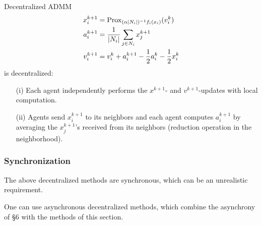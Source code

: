 \documentclass[10pt,mathserif]{beamer}
\begin{document}
\begin{frame}
Decentralized ADMM
\begin{align*}
     x_i^{k+1} &= \prox_{(\alpha|N_i|)^{-1}f_i(x_i)}(v_i^k) \\%
      a_i^{k+1} &= \frac{1}{|N_i|}\sum_{j\in N_i}x_j^{k+1} \\
     v_i^{k+1} &= v_i^k + a_i^{k+1}-\frac{1}{2}a_i^k - \frac{1}{2}x_i^k%
\end{align*}
is decentralized:
\begin{itemize}
\item[(i)] Each agent independently performs the $x^{k+1}$- and $v^{k+1}$-updates with local computation. 
\item[(ii)] Agents send $x^{k+1}_i$ to its neighbors and each agent computes $a^{k+1}_i$ by averaging the $x^{k+1}_j$'s received from its neighbors (reduction operation in the neighborhood).
\end{itemize}
\end{frame}


\begin{frame}
\frametitle{Synchronization}
The above decentralized methods are synchronous, which can be an unrealistic requirement.
\vspace{0.2in}


One can use asynchronous decentralized methods, which combine the asynchrony of \S6 with the methods of this section.
\end{frame}
\end{document}
